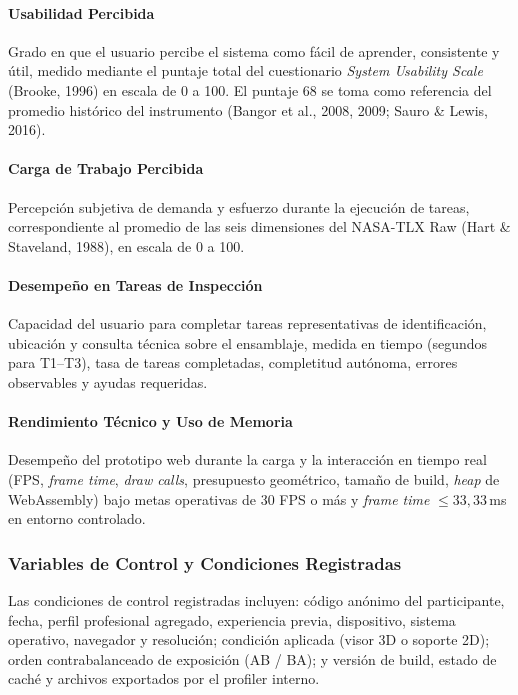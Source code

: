 \paragraph{Usabilidad Percibida} Grado en que el usuario percibe el sistema como fácil de aprender, consistente y útil, medido mediante el puntaje total del cuestionario \textit{System Usability Scale} (Brooke, 1996) en escala de 0 a 100. El puntaje 68 se toma como referencia del promedio histórico del instrumento (Bangor et al., 2008, 2009; Sauro \& Lewis, 2016).

\paragraph{Carga de Trabajo Percibida} Percepción subjetiva de demanda y esfuerzo durante la ejecución de tareas, correspondiente al promedio de las seis dimensiones del NASA-TLX Raw (Hart \& Staveland, 1988), en escala de 0 a 100.

\paragraph{Desempeño en Tareas de Inspección} Capacidad del usuario para completar tareas representativas de identificación, ubicación y consulta técnica sobre el ensamblaje, medida en tiempo (segundos para T1--T3), tasa de tareas completadas, completitud autónoma, errores observables y ayudas requeridas.

\paragraph{Rendimiento Técnico y Uso de Memoria} Desempeño del prototipo web durante la carga y la interacción en tiempo real (FPS, \textit{frame time}, \textit{draw calls}, presupuesto geométrico, tamaño de build, \textit{heap} de WebAssembly) bajo metas operativas de 30 FPS o más y \textit{frame time} $\leq 33{,}33$\,ms en entorno controlado.

\subsubsection{Variables de Control y Condiciones Registradas}

Las condiciones de control registradas incluyen: código anónimo del participante, fecha, perfil profesional agregado, experiencia previa, dispositivo, sistema operativo, navegador y resolución; condición aplicada (visor 3D o soporte 2D); orden contrabalanceado de exposición (AB / BA); y versión de build, estado de caché y archivos exportados por el profiler interno.

